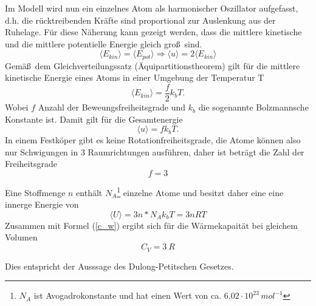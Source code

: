 \documentclass[11pt,ngerman,a4paper]{article}
\begin{document}
\noindent
Im Modell wird nun ein einzelnes Atom als harmonischer Oszillator aufgefasst, d.h. die r\"ucktreibenden Kr\"afte sind proportional zur Auslenkung aus der Ruhelage. F\"ur diese N\"aherung kann gezeigt werden, dass die mittlere kinetische und die mittlere potentielle Energie gleich gro\ss\ sind. 
\begin{equation}
\langle E_{kin} \rangle=\langle E_{pot} \rangle \Rightarrow \langle u \rangle = 2 \langle   E_{kin} \rangle
\end{equation}
Gem\"a\ss\ dem Gleichverteilungssatz (\"Aquipartitionstheorem) gilt f\"ur die mittlere kinetische Energie eines Atoms in einer Umgebung der Temperatur T
\begin{equation}
\langle E_{kin} \rangle = \frac{f}{2}k_b T.
\end{equation}
Wobei $f$ Anzahl der Beweungsfreiheitsgrade und $k_b$ die sogenannte Bolzmannsche Konstante ist. Damit gilt f\"ur die Gesamtenergie 
\begin{equation}
\langle u \rangle = f k_b T.
\end{equation}
In einem Festk\"oper gibt es keine Rotationfreiheitsgrade, die Atome k\"onnen also nur Schwigungen in 3 Raumrichtungen ausf\"uhren, daher ist betr\"agt die Zahl der Freiheitsgrade
\[f =3\]

Eine Stoffmenge $n$ enth\"alt $N_A$\footnote{$N_A$ ist Avogadrokonstante und hat einen Wert von ca. $6.02\cdot 10^{23}\,mol^{-1}$} einzelne Atome und besitzt daher eine eine innerge Energie von 
\begin{equation}
\langle U \rangle = 3 n* N_A k_b T = 3 n R T 
\end{equation}
Zusammen mit Formel (\ref{c_w}) ergibt sich f\"ur die W\"armekapait\"at bei gleichem Volumen
\begin{equation}
C_V= 3\ R
\end{equation}

Dies entspricht der Ausssage des Dulong-Petitschen Gesetzes.
\end{document}
